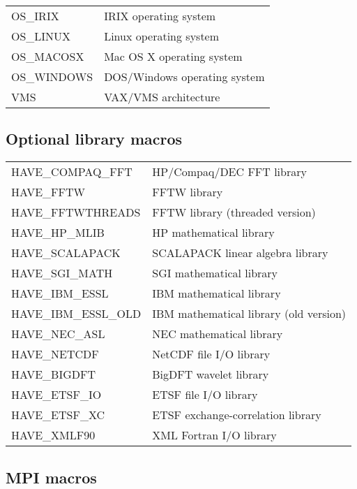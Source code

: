 \begin{center}
 \begin{tabular}{l l}
  OS\_IRIX & IRIX operating system \\
  OS\_LINUX & Linux operating system \\
  OS\_MACOSX & Mac OS X operating system \\
  OS\_WINDOWS & DOS/Windows operating system \\
  VMS & VAX/VMS architecture \\
 \end{tabular}
\end{center}



\subsection{Optional library macros}

\begin{center}
 \begin{tabular}{l l}
  HAVE\_COMPAQ\_FFT & HP/Compaq/DEC FFT library  \\
  HAVE\_FFTW & FFTW library \\
  HAVE\_FFTWTHREADS & FFTW library (threaded version) \\
  \hline
  HAVE\_HP\_MLIB & HP mathematical library \\
  HAVE\_SCALAPACK & SCALAPACK linear algebra library \\
  HAVE\_SGI\_MATH & SGI mathematical library \\
  HAVE\_IBM\_ESSL & IBM mathematical library \\
  HAVE\_IBM\_ESSL\_OLD & IBM mathematical library (old version) \\
  HAVE\_NEC\_ASL & NEC mathematical library \\
  \hline
  HAVE\_NETCDF & NetCDF file I/O library \\
  \hline
  HAVE\_BIGDFT & BigDFT wavelet library \\
  HAVE\_ETSF\_IO & ETSF file I/O library \\
  HAVE\_ETSF\_XC & ETSF exchange-correlation library \\
  HAVE\_XMLF90 & XML Fortran I/O library \\
 \end{tabular}
\end{center}



\subsection{MPI macros}

